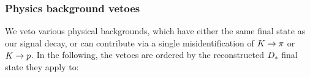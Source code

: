 %
%
 
 
\subsubsection{Physics background vetoes}

We veto various physical backgrounds, which have either the same final state as our signal decay, or can contribute via a single misidentification of ${K}\rightarrow{\ensuremath{\pi}}$ or ${K}\rightarrow{\ensuremath{p}}$. 
In the following, the vetoes are ordered by the reconstructed ${{D}_{s}}$ final state they apply to: 

